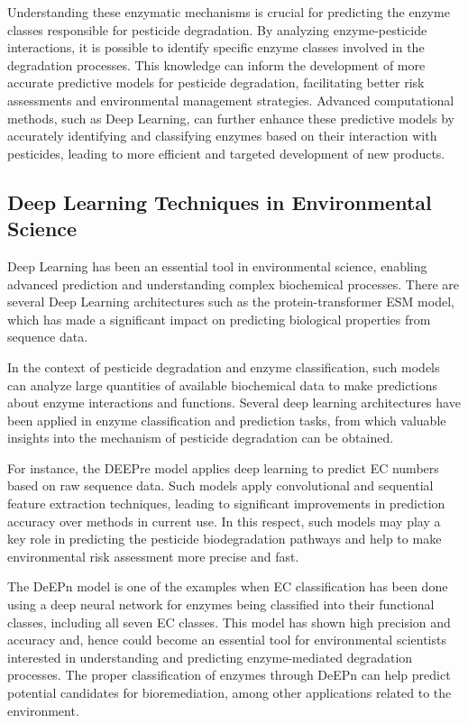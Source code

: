 Understanding these enzymatic mechanisms is crucial for predicting the enzyme classes responsible for pesticide degradation. By analyzing enzyme-pesticide interactions, it is possible to identify specific enzyme classes involved in the degradation processes. This knowledge can inform the development of more accurate predictive models for pesticide degradation, facilitating better risk assessments and environmental management strategies. Advanced computational methods, such as Deep Learning, can further enhance these predictive models by accurately identifying and classifying enzymes based on their interaction with pesticides, leading to more efficient and targeted development of new products.

\subsection{Deep Learning Techniques in Environmental Science}
\label{sec:Deep Learning Techniques in Environmental Science}

Deep Learning has been an essential tool in environmental science, enabling advanced prediction and understanding complex biochemical processes. There are several Deep Learning architectures such as the protein-transformer ESM model, which has made a significant impact on predicting biological properties from sequence data. \autocite{rivesBiologicalStructureFunction2021}

In the context of pesticide degradation and enzyme classification, such models can analyze large quantities of available biochemical data to make predictions about enzyme interactions and functions. Several deep learning architectures have been applied in enzyme classification and prediction tasks, from which valuable insights into the mechanism of pesticide degradation can be obtained.

For instance, the DEEPre model applies deep learning to predict EC numbers based on raw sequence data. Such models apply convolutional and sequential feature extraction techniques, leading to significant improvements in prediction accuracy over methods in current use. In this respect, such models may play a key role in predicting the pesticide biodegradation pathways and help to make environmental risk assessment more precise and fast. \autocite{liDEEPreSequencebasedEnzyme2017}

The DeEPn model is one of the examples when EC classification has been done using a deep neural network for enzymes being classified into their functional classes, including all seven EC classes. This model has shown high precision and accuracy and, hence could become an essential tool for environmental scientists interested in understanding and predicting enzyme-mediated degradation processes. The proper classification of enzymes through DeEPn can help predict potential candidates for bioremediation, among other applications related to the environment. \autocite{DeEPnDeepNeural}

